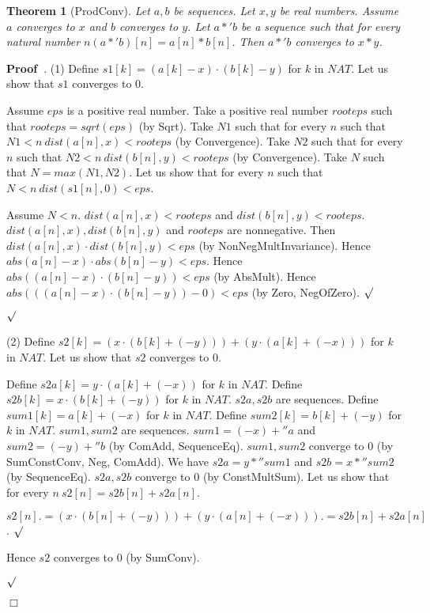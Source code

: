 \documentclass{article}
\newenvironment{forthel}{\begin{leftbar}}{\end{leftbar}}
\newenvironment{proof}{\noindent\textbf{Proof\ }}{\hspace*{\fill}$\Box$\medskip}
\newenvironment{subproof}{\begin{list}{}{}
		\item[\text{Proof}]}{\hfill $\surd$ \end{list}}
\newtheorem{theorem}{Theorem}
\begin{document}
\begin{forthel}
	\begin{theorem} [ProdConv]
	Let $a,b$ be sequences. Let $x,y$ be real numbers. Assume $a$ converges to $x$ and $b$ converges to $y$.
	Let $a *' b$ be a sequence such that for every natural number $n (a *' b)[n] = a[n] * b[n]$.
	Then $a *' b$ converges to $x * y$.
	\end{theorem}
	\begin{proof}.
	(1) Define $s1[k] = (a[k] - x) \cdot (b[k] - y)$ for $k$ in $NAT$.
	Let us show that $s1$ converges to $0$.
	\begin{subproof}
    Assume $eps$ is a positive real number. 
    Take a positive real number $rooteps$ such that $rooteps = sqrt(eps)$ (by Sqrt).
    Take $N1$ such that for every $n$ such that $N1 < n \ dist(a[n],x) < rooteps$ (by Convergence).
    Take $N2$ such that for every $n$ such that $N2 < n \ dist(b[n],y) < rooteps$ (by Convergence).
    Take $N$ such that $N = max(N1,N2)$.
    Let us show that for every $n$ such that $N < n \ dist(s1[n],0) < eps$.
    \begin{subproof}
    Assume $N < n$.
    $dist(a[n],x) < rooteps$ and $dist(b[n],y) < rooteps$.
    $dist(a[n],x), dist(b[n],y)$ and $rooteps$ are nonnegative.
    Then $dist(a[n],x) \cdot dist(b[n],y) < eps$ (by NonNegMultInvariance).
    Hence $abs(a[n] - x) \cdot abs(b[n] - y) < eps$.
    Hence $abs((a[n] - x) \cdot (b[n] - y)) < eps$ (by AbsMult).
    Hence $abs(((a[n] - x) \cdot (b[n] - y)) - 0) < eps$ (by Zero, NegOfZero).
    \end{subproof}
	\end{subproof}
	(2) Define $s2[k] = (x \cdot (b[k] + (-y))) + (y \cdot (a[k] + (-x)))$ for $k$ in $NAT$.
	Let us show that $s2$ converges to $0$.
	\begin{subproof}
	Define $s2a[k] = y \cdot (a[k] + (-x))$ for $k$ in $NAT$.
	Define $s2b[k] = x \cdot (b[k] + (-y))$ for $k$ in $NAT$.
	$s2a, s2b$ are sequences.
	Define $sum1[k] = a[k] + (-x)$ for $k$ in $NAT$.
	Define $sum2[k] = b[k] + (-y)$ for $k$ in $NAT$.
	$sum1, sum2$ are sequences.
	$sum1 = (-x) +'' a$ and $sum2 = (-y) +'' b$ (by ComAdd, SequenceEq).
	$sum1, sum2$ converge to $0$ (by SumConstConv, Neg, ComAdd).
	We have $s2a = y *'' sum1$ and $s2b = x *'' sum2$ (by SequenceEq).
	$s2a, s2b$ converge to $0$ (by ConstMultSum). 
	Let us show that for every $n \ s2[n] = s2b[n] + s2a[n]$.
	\begin{subproof}
	$s2[n] .= (x \cdot (b[n] + (-y))) + (y \cdot (a[n] + (-x)))
	.= s2b[n] + s2a[n]$.
	\end{subproof}
	Hence $s2$ converges to $0$ (by SumConv).

\end{subproof}
\end{proof}
\end{forthel}
\end{document}

